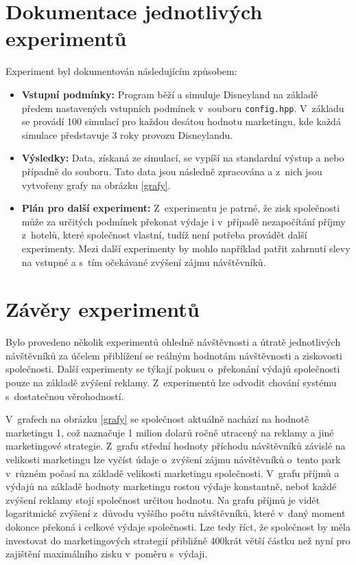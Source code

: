 \section{Dokumentace jednotlivých experimentů}
Experiment byl dokumentován následujícím způsobem:
\begin{itemize}
    \item \textbf{Vstupní podmínky:} Program běží a simuluje Disneyland na základě předem nastavených vstupních podmínek v~souboru \texttt{config.hpp}. V~základu se provádí 100 simulací pro každou desátou hodnotu marketingu, kde každá simulace představuje 3 roky provozu Disneylandu.
    \item \textbf{Výsledky:} Data, získaná ze simulací, se vypíší na standardní výstup a nebo případně do souboru. Tato data jsou následně zpracována a z~nich jsou vytvořeny grafy na obrázku \ref{grafy}.
    \item \textbf{Plán pro další experiment:} Z~experimentu je patrné, že zisk společnosti může za určitých podmínek překonat výdaje i v~případě nezapočítání příjmy z~hotelů, které společnost vlastní, tudíž není potřeba provádět další experimenty. Mezi další experimenty by mohlo například patřit zahrnutí slevy na vstupné a s~tím očekávané zvýšení zájmu návštěvníků.
\end{itemize}

\section{Závěry experimentů}
Bylo provedeno několik experimentů ohledně návštěvnosti a útratě jednotlivých návštěvníků za účelem přiblížení se reálným hodnotám návštěvnosti a ziskovosti společnosti. Další experimenty se týkají pokusu o~překonání výdajů společnosti pouze na základě zvýšení reklamy. Z~experimentů lze odvodit chování systému s~dostatečnou věrohodností.

V~grafech na obrázku \ref{grafy} se společnost aktuálně nachází na hodnotě marketingu 1, což naznačuje 1 milion dolarů ročně utracený na reklamy a jiné marketingové strategie. Z~grafu střední hodnoty příchodu návštěvníků závislé na velikosti marketingu lze vyčíst údaje o~zvýšení zájmu návštěvníků o~tento park v~různém počasí na základě velikosti marketingu společnosti. V~grafu příjmů a výdajů na základě hodnoty marketingu rostou výdaje konstantně, neboť každé zvýšení reklamy stojí společnost určitou hodnotu. Na grafu příjmů je vidět logaritmické zvýšení z~důvodu vyššího počtu návštěvníků, které v~daný moment dokonce překoná i celkové výdaje společnosti. Lze tedy říct, že společnost by měla investovat do marketingových strategií přibližně 400krát větší částku než nyní pro zajištění maximálního zisku v~poměru s~výdaji.

